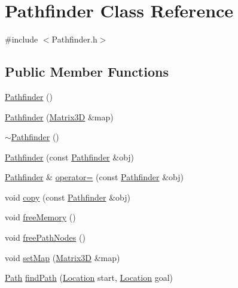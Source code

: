 \hypertarget{classPathfinder}{\section{Pathfinder Class Reference}
\label{classPathfinder}
}


{\ttfamily \#include $<$Pathfinder.\-h$>$}

\subsection*{Public Member Functions}
\begin{DoxyCompactItemize}
\item 
\hyperlink{classPathfinder_af562d840858cf2b369fcee51f5069456}{Pathfinder} ()
\item 
\hyperlink{classPathfinder_a52ace2447eb20a8736c9b6eecb2a39e4}{Pathfinder} (\hyperlink{classMatrix3D}{Matrix3\-D} \&map)
\item 
\hyperlink{classPathfinder_a5b39561ad7375cfdc493d58cbb9fdc1b}{$\sim$\-Pathfinder} ()
\item 
\hyperlink{classPathfinder_ace22f0efc61b22a923f0c01fdcea0fb1}{Pathfinder} (const \hyperlink{classPathfinder}{Pathfinder} \&obj)
\item 
\hyperlink{classPathfinder}{Pathfinder} \& \hyperlink{classPathfinder_a7d1e82ebc1cf7c5f36a418f61721c61c}{operator=} (const \hyperlink{classPathfinder}{Pathfinder} \&obj)
\item 
void \hyperlink{classPathfinder_a2760969261a397539e0be0ec0ad25267}{copy} (const \hyperlink{classPathfinder}{Pathfinder} \&obj)
\item 
void \hyperlink{classPathfinder_aa92e55229fec296527e2975889fed2bd}{free\-Memory} ()
\item 
void \hyperlink{classPathfinder_a20c13e5c6e005825b7536834867440b6}{free\-Path\-Nodes} ()
\item 
void \hyperlink{classPathfinder_a3486c2d2a08f4b34ca76433dedda2642}{set\-Map} (\hyperlink{classMatrix3D}{Matrix3\-D} \&map)
\item 
\hyperlink{classPath}{Path} \hyperlink{classPathfinder_a211525380e7534f4721588e698b7a889}{find\-Path} (\hyperlink{structLocation}{Location} start, \hyperlink{structLocation}{Location} goal)
\end{DoxyCompactItemize}



